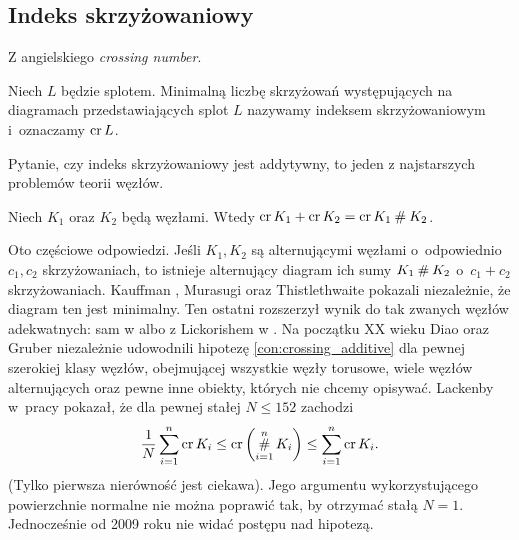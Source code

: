 \subsection{Indeks skrzyżowaniowy}
%
\label{sub:crossing_number}%
Z angielskiego \emph{crossing number}.

\begin{definition}
    Niech $L$ będzie splotem.
    Minimalną liczbę skrzyżowań występujących na diagramach przedstawiających splot $L$ nazywamy indeksem skrzyżowaniowym i~oznaczamy $\operatorname{cr} L$.
\end{definition}

Pytanie, czy indeks skrzyżowaniowy jest addytywny, to jeden z najstarszych problemów teorii węzłów.

\begin{conjecture}
%
\label{con:crossing_additive}%
    Niech $K_1$ oraz $K_2$ będą węzłami.
    Wtedy $\operatorname{cr} K_1 + \operatorname{cr} K_2 = \operatorname{cr} K_1 \mathbin{\#} K_2$.
\end{conjecture}

Oto częściowe odpowiedzi.
Jeśli $K_1, K_2$ są alternującymi węzłami o~odpowiednio $c_1, c_2$ skrzyżowaniach, to istnieje alternujący diagram ich sumy $K_1 \mathbin{\#} K_2$ o~$c_1 + c_2$ skrzyżowaniach.
%
Kauffman \cite[twierdzenie 2.10]{kauffman87}, Murasugi \cite[wniosek 6]{murasugi87} oraz Thistlethwaite \cite[wniosek 1]{thistlethwaite87} pokazali niezależnie, że diagram ten jest minimalny.
Ten ostatni rozszerzył wynik do tak zwanych węzłów adekwatnych: sam w \cite{thistlethwaite88} albo z Lickorishem w \cite{lickorish88}.
%
Na początku XX wieku Diao \cite{diao04} oraz Gruber \cite{gruber03} niezależnie udowodnili hipotezę \ref{con:crossing_additive} dla pewnej szerokiej klasy węzłów, obejmującej wszystkie węzły torusowe, wiele węzłów alternujących oraz pewne inne obiekty, których nie chcemy opisywać.
%
Lackenby w~pracy \cite{lackenby09} pokazał, że dla pewnej stałej $N \le 152$ zachodzi
\begin{equation}
    \frac 1 N \sum_{i=1}^n \operatorname{cr}{K_i} \le \operatorname{cr} \left(\operatorname*{\#}_{i=1}^n K_i\right) \le \sum_{i=1}^n \operatorname{cr}{K_i}.
\end{equation}
(Tylko pierwsza nierówność jest ciekawa).
Jego argumentu wykorzystującego powierzchnie normalne nie można poprawić tak, by otrzymać stałą $N = 1$.
Jednocześnie od 2009 roku nie widać postępu nad hipotezą.

%

